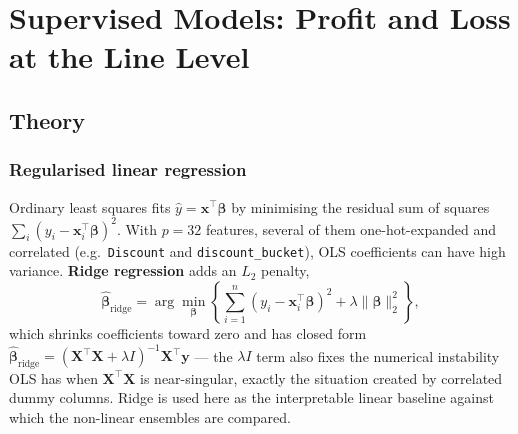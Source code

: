 \chapter{Supervised Models: Profit and Loss at the Line Level}
\label{ch:models}

\section{Theory}

\subsection{Regularised linear regression}
Ordinary least squares fits $\hat y = \mathbf{x}^\top\boldsymbol\beta$ by
minimising the residual sum of squares
$\sum_i (y_i - \mathbf{x}_i^\top\boldsymbol\beta)^2$. With $p=32$
features, several of them one-hot-expanded and correlated (e.g.\
\texttt{Discount} and \texttt{discount\_bucket}), OLS coefficients can
have high variance. \textbf{Ridge regression} adds an $L_2$ penalty,
\begin{equation}
  \hat{\boldsymbol\beta}_{\text{ridge}} = \arg\min_{\boldsymbol\beta}
  \left\{ \sum_{i=1}^n (y_i - \mathbf{x}_i^\top\boldsymbol\beta)^2
          + \lambda \lVert\boldsymbol\beta\rVert_2^2 \right\},
  \label{eq:ridge}
\end{equation}
which shrinks coefficients toward zero and has closed form
$\hat{\boldsymbol\beta}_{\text{ridge}} = (\mathbf{X}^\top\mathbf{X} +
\lambda I)^{-1}\mathbf{X}^\top\mathbf{y}$ — the $\lambda I$ term also
fixes the numerical instability OLS has when $\mathbf{X}^\top\mathbf{X}$
is near-singular, exactly the situation created by correlated dummy
columns. Ridge is used here as the interpretable linear baseline against
which the non-linear ensembles are compared.

